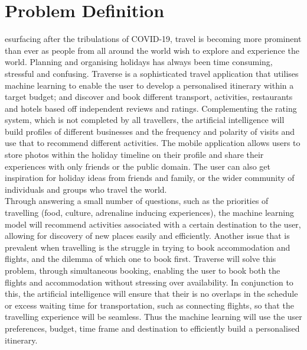 \let\textcircled=\pgftextcircled
\chapter{Problem Definition}
\label{chap:intro}

esurfacing after the tribulations of COVID-19, travel is becoming more prominent than ever as people from all around the world wish to explore and experience the world. Planning and organising holidays has always been time consuming, stressful and confusing. Traverse is a sophisticated travel application that utilises machine learning to enable the user to develop a personalised itinerary within a target budget; and discover and book different transport, activities, restaurants and hotels based off independent reviews and ratings. Complementing the rating system, which is not completed by all travellers, the artificial intelligence will build profiles of different businesses and the frequency and polarity of visits and use that to recommend different activities. The mobile application allows users to store photos within the holiday timeline on their profile and share their experiences with only friends or the public domain. The user can also get inspiration for holiday ideas from friends and family, or the wider community of individuals and groups who travel the world. \\

Through answering a small number of questions, such as the priorities of travelling (food, culture, adrenaline inducing experiences), the machine learning model will recommend activities associated with a certain destination to the user, allowing for discovery of new places easily and efficiently. Another issue that is prevalent when travelling is the struggle in trying to book accommodation and flights, and the dilemma of which one to book first. Traverse will solve this problem, through simultaneous booking, enabling the user to book both the flights and accommodation without stressing over availability. In conjunction to this, the artificial intelligence will ensure that their is no overlaps in the schedule or excess waiting time for transportation, such as connecting flights, so that the travelling experience will be seamless. Thus the machine learning will use the user preferences, budget, time frame and destination to efficiently build a personalised itinerary. \\

